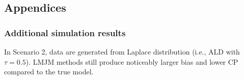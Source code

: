 




% 


\subsection*{Appendices}
\renewcommand{\thesubsubsection}{\Alph{subsubsection}}


\subsubsection{Additional simulation results}\label{sec:p2appendix_simulation}
In Scenario 2, data are generated from Laplace distribution (i.e., ALD with $\tau=0.5$). LMJM methods still produce noticeably larger bias and lower CP compared to the true model.

